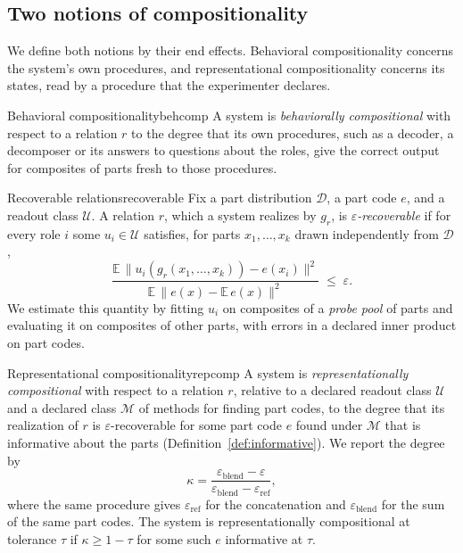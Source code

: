 \documentclass[10pt]{article}
\theoremstyle{plain}
\theoremstyle{remark}
\newcommand{\U}{\mathcal{U}}
\newcommand{\M}{\mathcal{M}}
\newcommand{\D}{\mathcal{D}}
\begin{document}
\subsection{Two notions of compositionality}
\label{sec:notions}

We define both notions by their end effects. Behavioral compositionality concerns the system's own procedures, and representational compositionality concerns its states, read by a procedure that the experimenter declares.

\begin{defbox}{Behavioral compositionality}{behcomp}
A system is \emph{behaviorally compositional} with respect to a relation $r$ to the degree that its own procedures, such as a decoder, a decomposer or its answers to questions about the roles, give the correct output for composites of parts fresh to those procedures.
\end{defbox}

\begin{defbox}{Recoverable relations}{recoverable}
Fix a part distribution $\D$, a part code $e$, and a readout class $\U$. A relation $r$, which a system realizes by $g_r$, is \emph{$\varepsilon$-recoverable} if for every role $i$ some $u_i \in \U$ satisfies, for parts $x_1, \ldots, x_k$ drawn independently from $\D$,
\begin{equation}
  \frac{\mathbb{E}\,\lVert u_i(g_r(x_1,\ldots,x_k)) - e(x_i) \rVert^2}{\mathbb{E}\,\lVert e(x) - \mathbb{E}\,e(x) \rVert^2} \;\le\; \varepsilon .
  \label{eq:recover}
\end{equation}
We estimate this quantity by fitting $u_i$ on composites of a \emph{probe pool} of parts and evaluating it on composites of other parts, with errors in a declared inner product on part codes.
\end{defbox}

\begin{defbox}{Representational compositionality}{repcomp}
A system is \emph{representationally compositional} with respect to a relation $r$, relative to a declared readout class $\U$ and a declared class $\M$ of methods for finding part codes, to the degree that its realization of $r$ is $\varepsilon$-recoverable for some part code $e$ found under $\M$ that is informative about the parts (Definition~\ref{def:informative}). We report the degree by
\begin{equation}
  \kappa = \frac{\varepsilon_{\mathrm{blend}} - \varepsilon}{\varepsilon_{\mathrm{blend}} - \varepsilon_{\mathrm{ref}}},
  \label{eq:kappa}
\end{equation}
where the same procedure gives $\varepsilon_{\mathrm{ref}}$ for the concatenation and $\varepsilon_{\mathrm{blend}}$ for the sum of the same part codes. The system is representationally compositional at tolerance $\tau$ if $\kappa \ge 1 - \tau$ for some such $e$ informative at $\tau$.
\end{defbox}
\end{document}

